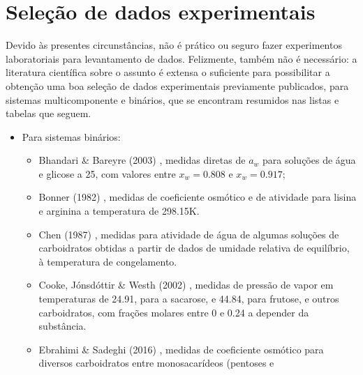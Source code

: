 \documentclass[
	12pt,				%
	openright,
	twoside,
	a4paper,			%
	english,			%
	french,				%
	spanish,			%
	brazil				%
	]{abntex2}
\begin{document}
\section{Seleção de dados experimentais}

\label{sec_selec_data}

Devido às presentes circunstâncias, não é prático ou seguro fazer experimentos
laboratoriais para levantamento de dados. Felizmente, também não é necessário:
a literatura científica sobre o assunto é extensa o suficiente para possibilitar
a obtenção uma boa seleção de dados experimentais previamente publicados, para
sistemas multicomponente e binários, que se encontram resumidos nas listas e
tabelas que seguem.

\begin{itemize}
	\item Para sistemas binários:
		\begin{itemize}
			\item Bhandari \& Bareyre (2003) \cite{bhandari2003},
				medidas diretas de $a_w$ para soluções de água
				e glicose a 25\textcelsius, com valores entre
				$x_w = 0.808$ e $x_w = 0.917$;
			\item Bonner (1982) \cite{bonner1982}, medidas de
				coeficiente osmótico e de atividade para lisina
				e arginina a temperatura de 298.15K.
			\item Chen (1987) \cite{chen1987}, medidas para atividade
				de água de algumas soluções de carboidratos obtidas
				a partir de dados de umidade relativa de equilíbrio,
				à temperatura de congelamento.
			\item Cooke, Jónsdóttir \& Westh (2002) \cite{cooke2002a},
				medidas de pressão de vapor em temperaturas de
				24.91\textcelsius, para a sacarose, e
				44.84\textcelsius, para frutose, e outros
				carboidratos, com frações molares entre 0 e 0.24 a
				depender da substância.
			\item Ebrahimi \& Sadeghi (2016) \cite{ebrahimi2016},
				medidas de coeficiente osmótico para diversos
				carboidratos entre monosacarídeos (pentoses e

\end{itemize}
\end{itemize}
\end{document}
